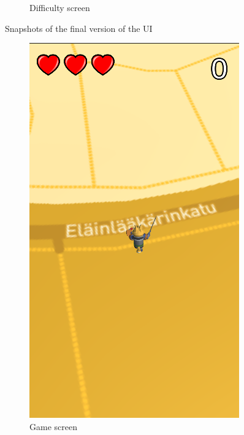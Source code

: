\documentclass{dissertation}
\begin{document}
\begin{appendices}
\begin{figure}[H]
\begin{subfigure}[h]{.5\textwidth}
\caption{Difficulty screen}
\label{fig:f4}
\end{subfigure}
\caption{Snapshots of the final version of the UI}
\label{fig:final-deliv-ui}
\end{figure}

\begin{figure}[H]
\begin{subfigure}[h]{.5\textwidth}
\centering
\includegraphics[width = .7\linewidth]{images/final-ui5.png}
\caption{Game screen}
\label{fig:f5}
\end{subfigure}
\begin{subfigure}[h]{.5\textwidth}
\centering

\end{subfigure}
\end{figure}
\end{appendices}
\end{document}
